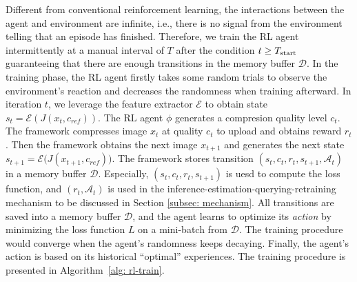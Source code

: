 Different from conventional reinforcement learning, the interactions between the agent and environment are infinite, i.e., there is no signal from the environment telling that an episode has finished. Therefore, we train the RL agent intermittently at a manual interval of $ T $ after the condition $ t \geq T_{\rm start} $ guaranteeing that there are enough transitions in the memory buffer $ \mathcal{D} $. In the training phase, the RL agent firstly takes some random trials to observe the environment's reaction and decreases the randomness when training afterward. {\color{revise2} In iteration $t$, we  leverage the feature extractor $\mathcal{E}$ to obtain state $s_t = \mathcal{E}(J(x_t,c_{ref}))$. The RL agent $\phi$ generates a compresion quality level $c_t$. The framework compresses image $x_t$ at quality $c_t$ to upload and obtains reward $r_t$. Then the framework obtains the next image $x_{t+1}$ and generates the next state $ s_{t+1} = \mathcal{E}\big(J(x_{t+1},c_{ref})\big) $. The framework stores transition $(s_t, c_t, r_t, s_{t+1},\mathcal{A}_t )$ in a memory buffer $\mathcal{D}$. Especially, $(s_t, c_t, r_t, s_{t+1} )$ is uesd to compute the loss function, and $(r_t,\mathcal{A}_t )$ is used in the inference-estimation-querying-retraining mechanism to be discussed in Section \ref{subsec: mechanism}.} All transitions are saved into a memory buffer $ \mathcal{D} $, and the agent learns to optimize its \emph{action} by minimizing the loss function $ L $ on a mini-batch from $ \mathcal{D} $. The training procedure would converge when the agent's randomness keeps decaying. Finally, the agent's action is based on its historical ``optimal'' experiences. The training procedure is presented in Algorithm~\ref{alg: rl-train}.


